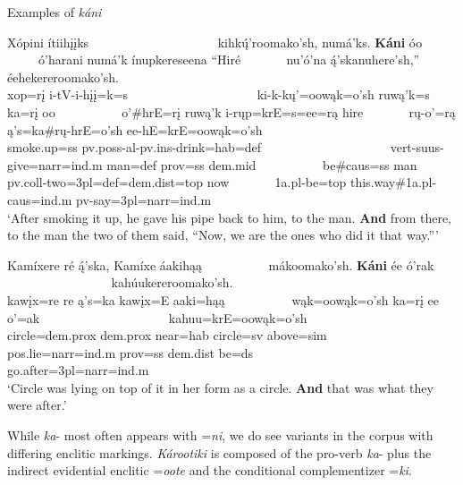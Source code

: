 \begin{exe}
    \item\label{Ch6KaniEx} Examples of \textit{káni}
        \begin{xlist}
        \item\label{Ch6KaniExA}
        \glll Xópini ítiihįįks ~ ~ ~ ~ ~ ~ ~ ~ ~ ~ ~ ~ kihkų́'roomako'sh, numá'ks. \textbf{Káni} óo ~ ~ ~ ~ ~ ~ ó'harani numá'k ínupkereseena ``Hiré ~ ~ ~ ~ nu'ó'na  ą́'skanuhere'sh,'' éehekereroomako'sh.\\
        xop=rį i-tV-i-hįį=k=s ~ ~ ~ ~ ~ ~ ~ ~ ~ ~ ~ ~ ki-k-kų'=oowąk=o'sh ruwą'k=s ka=rį oo ~ ~ ~ ~ ~ ~ o'\#hrE=rį ruwą'k i-rųp=krE=s=ee=rą hire ~ ~ ~ ~ rų-o'=rą ą's=ka\#rų-hrE=o'sh ee-hE=krE=oowąk=o'sh\\
        \textnormal{smoke.up}=ss pv.poss-al-pv.ins-\textnormal{drink}=hab=def ~ ~ ~ ~ ~ ~ ~ ~ ~ ~ ~ ~ vert-suus-\textnormal{give}=narr=ind.m \textnormal{man}=def prov=ss dem.mid ~ ~ ~ ~ ~ ~ \textnormal{be}\#caus=ss \textnormal{man} pv.coll-\textnormal{two}=3pl=def=dem.dist=top \textnormal{now} ~ ~ ~ ~ 1a.pl-\textnormal{be}=top \textnormal{this.way}\#1a.pl-caus=ind.m pv-\textnormal{say}=3pl=narr=ind.m\\
        \glt `After smoking it up, he gave his pipe back to him, to the man. \textbf{And} from there, to the man the two of them said, ``Now, we are the ones who did it that way.{''}' \citep[175]{hollow1973b}

        \item\label{Ch6KaniExB} \glll Kamíxere ré ą́'ska, Kamíxe áakihąą ~ ~ ~ ~ ~ ~ mákoomako'sh. \textbf{Káni} ée ó'rak ~ ~ ~ ~ ~ ~ ~ ~ ~ ~ ~ ~ kahúukereroomako'sh.\\
        kawįx=re re ą's=ka kawįx=E aaki=hąą ~ ~ ~ ~ ~ ~ wąk=oowąk=o'sh ka=rį ee o'=ak ~ ~ ~ ~ ~ ~ ~ ~ ~ ~ ~ ~ kahuu=krE=oowąk=o'sh\\
        \textnormal{circle}=dem.prox dem.prox \textnormal{near}=hab \textnormal{circle}=sv \textnormal{above}=sim ~ ~ ~ ~ ~ ~ pos.lie=narr=ind.m prov=ss dem.dist \textnormal{be}=ds ~ ~ ~ ~ ~ ~ ~ ~ ~ ~ ~ ~ \textnormal{go.after}=3pl=narr=ind.m\\
        \glt `Circle was lying on top of it in her form as a circle. \textbf{And} that was what they were after.' \citep[107]{trechter2012b}
        \end{xlist}
\end{exe}

While \textit{ka}- most often appears with =\textit{ni}, we do see variants in the corpus with differing enclitic markings. \textit{Károotiki} is composed of the pro-verb \textit{ka}- plus the indirect evidential enclitic =\textit{oote} and the conditional complementizer =\textit{ki}.

